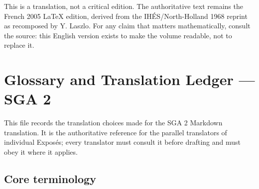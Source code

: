 \documentclass[
]{article}
\begin{document}
This is a translation, not a critical edition. The authoritative text
remains the French 2005 LaTeX edition, derived from the
IHÉS/North-Holland 1968 reprint as recomposed by Y. Laszlo. For any
claim that matters mathematically, consult the source: this English
version exists to make the volume readable, not to replace it.

\section{Glossary and Translation Ledger --- SGA
2}\label{glossary-and-translation-ledger-sga-2}

This file records the translation choices made for the SGA 2 Markdown
translation. It is the authoritative reference for the parallel
translators of individual Exposés; every translator must consult it
before drafting and must obey it where it applies.

\subsection{Core terminology}\label{core-terminology}
\end{document}
